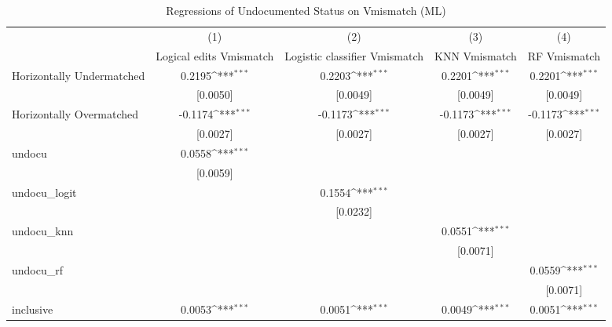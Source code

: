 \begin{table}[htbp]\centering
\def\sym#1{\ifmmode^{#1}\else\(^{#1}\)\fi}
\caption{Regressions of Undocumented Status on Vmismatch (ML)}
\begin{tabular}{l*{4}{c}}
\toprule
                    &\multicolumn{1}{c}{(1)}         &\multicolumn{1}{c}{(2)}         &\multicolumn{1}{c}{(3)}         &\multicolumn{1}{c}{(4)}         \\
                    &Logical edits Vmismatch         &Logistic classifier Vmismatch         &KNN Vmismatch         &RF Vmismatch         \\
\midrule
Horizontally Undermatched&      0.2195\sym{***}&      0.2203\sym{***}&      0.2201\sym{***}&      0.2201\sym{***}\\
                    &    [0.0050]         &    [0.0049]         &    [0.0049]         &    [0.0049]         \\
\addlinespace
Horizontally Overmatched&     -0.1174\sym{***}&     -0.1173\sym{***}&     -0.1173\sym{***}&     -0.1173\sym{***}\\
                    &    [0.0027]         &    [0.0027]         &    [0.0027]         &    [0.0027]         \\
\addlinespace
undocu              &      0.0558\sym{***}&                     &                     &                     \\
                    &    [0.0059]         &                     &                     &                     \\
\addlinespace
undocu\_logit        &                     &      0.1554\sym{***}&                     &                     \\
                    &                     &    [0.0232]         &                     &                     \\
\addlinespace
undocu\_knn          &                     &                     &      0.0551\sym{***}&                     \\
                    &                     &                     &    [0.0071]         &                     \\
\addlinespace
undocu\_rf           &                     &                     &                     &      0.0559\sym{***}\\
                    &                     &                     &                     &    [0.0071]         \\
\addlinespace
inclusive           &      0.0053\sym{***}&      0.0051\sym{***}&      0.0049\sym{***}&      0.0051\sym{***}\\

\end{tabular}
\end{table}
